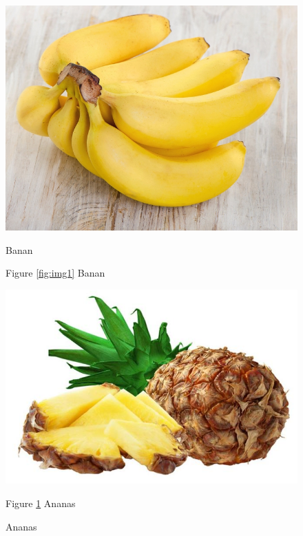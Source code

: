 \documentclass[11pt]{article}
\begin{document}
\begin{center}
\begin{figure}[!tbp]
  \centering
  \begin{minipage}[b]{0.4\textwidth}
    \includegraphics[width=\textwidth]{Banan}
    \caption{Banan}
    \label{fig:img1}
    Figure \ref{fig:img1} Banan
  \end{minipage}
  \hfill
  \begin{minipage}[b]{0.4\textwidth}
    \includegraphics[width=\textwidth]{Ananas}
    \caption{Ananas}
    \label{fig:img2}
    Figure \ref{fig:img2} Ananas
  \end{minipage}
\end{figure}

 
\end{center}
 \newpage
\end{document}
